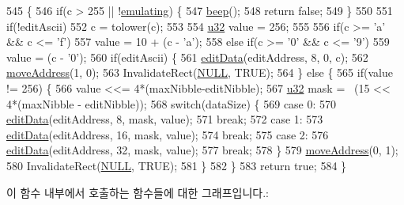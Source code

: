 \begin{DoxyCode}
545 \{
546   \textcolor{keywordflow}{if}(c > 255 || !\mbox{\hyperlink{_memory_viewer_8cpp_af9cc36078b1b311753963297ae7f2a74}{emulating}}) \{
547     \mbox{\hyperlink{class_memory_viewer_a32096a7542505dd4c2b94b9a1f715ae9}{beep}}();
548     \textcolor{keywordflow}{return} \textcolor{keyword}{false};
549   \}
550 
551   \textcolor{keywordflow}{if}(!editAscii)
552     c = tolower(c);
553 
554   \mbox{\hyperlink{_system_8h_a10e94b422ef0c20dcdec20d31a1f5049}{u32}} value = 256;
555 
556   \textcolor{keywordflow}{if}(c >= \textcolor{charliteral}{'a'} && c <= \textcolor{charliteral}{'f'})
557     value = 10 + (c - \textcolor{charliteral}{'a'});
558   \textcolor{keywordflow}{else} \textcolor{keywordflow}{if}(c >= \textcolor{charliteral}{'0'} && c <= \textcolor{charliteral}{'9'})
559     value = (c - \textcolor{charliteral}{'0'});
560   \textcolor{keywordflow}{if}(editAscii) \{
561     \mbox{\hyperlink{class_memory_viewer_a07778cf336e9f145a6403849407fb72d}{editData}}(editAddress, 8, 0, c);
562     \mbox{\hyperlink{class_memory_viewer_a0a371c925fc00dd78fedd8d21ebc8cdc}{moveAddress}}(1, 0);
563     InvalidateRect(\mbox{\hyperlink{getopt1_8c_a070d2ce7b6bb7e5c05602aa8c308d0c4}{NULL}}, TRUE);
564   \} \textcolor{keywordflow}{else} \{
565     \textcolor{keywordflow}{if}(value != 256) \{
566       value <<= 4*(maxNibble-editNibble);
567       \mbox{\hyperlink{_system_8h_a10e94b422ef0c20dcdec20d31a1f5049}{u32}} mask = ~(15 << 4*(maxNibble - editNibble));
568       \textcolor{keywordflow}{switch}(dataSize) \{
569       \textcolor{keywordflow}{case} 0:
570         \mbox{\hyperlink{class_memory_viewer_a07778cf336e9f145a6403849407fb72d}{editData}}(editAddress, 8, mask, value);
571         \textcolor{keywordflow}{break};
572       \textcolor{keywordflow}{case} 1:
573         \mbox{\hyperlink{class_memory_viewer_a07778cf336e9f145a6403849407fb72d}{editData}}(editAddress, 16, mask, value);
574         \textcolor{keywordflow}{break};
575       \textcolor{keywordflow}{case} 2:
576         \mbox{\hyperlink{class_memory_viewer_a07778cf336e9f145a6403849407fb72d}{editData}}(editAddress, 32, mask, value);
577         \textcolor{keywordflow}{break};
578       \}
579       \mbox{\hyperlink{class_memory_viewer_a0a371c925fc00dd78fedd8d21ebc8cdc}{moveAddress}}(0, 1);
580       InvalidateRect(\mbox{\hyperlink{getopt1_8c_a070d2ce7b6bb7e5c05602aa8c308d0c4}{NULL}}, TRUE);
581     \}
582   \}
583   \textcolor{keywordflow}{return} \textcolor{keyword}{true};
584 \}
\end{DoxyCode}
이 함수 내부에서 호출하는 함수들에 대한 그래프입니다.\+:
